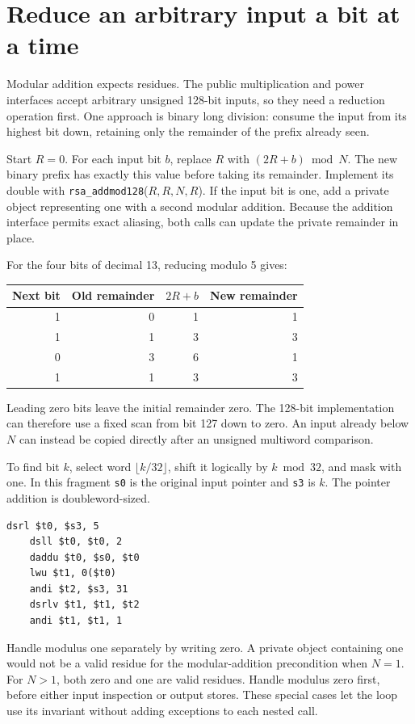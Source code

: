 \section{Reduce an arbitrary input a bit at a time}
Modular addition expects residues. The public multiplication and power interfaces
accept arbitrary unsigned 128-bit inputs, so they need a reduction operation first.
One approach is binary long division: consume the input from its highest bit down,
retaining only the remainder of the prefix already seen.

Start \(R=0\). For each input bit \(b\), replace \(R\) with \((2R+b)\bmod N\).
The new binary prefix has exactly this value before taking its remainder. Implement
its double with \texttt{rsa\_addmod128}(\(R,R,N,R\)). If the input bit is one, add
a private object representing one with a second modular addition. Because the addition
interface permits exact aliasing, both calls can update the private remainder in place.

For the four bits of decimal 13, reducing modulo 5 gives:
\begin{center}
\begin{tabular}{rrrr}
Next bit & Old remainder & \(2R+b\) & New remainder \\
\hline
1 & 0 & 1 & 1 \\
1 & 1 & 3 & 3 \\
0 & 3 & 6 & 1 \\
1 & 1 & 3 & 3 \\
\end{tabular}
\end{center}
Leading zero bits leave the initial remainder zero. The 128-bit implementation can
therefore use a fixed scan from bit 127 down to zero. An input already below \(N\)
can instead be copied directly after an unsigned multiword comparison.

To find bit \(k\), select word \(\lfloor k/32\rfloor\), shift it logically by
\(k\bmod32\), and mask with one. In this fragment \texttt{s0} is the original
input pointer and \texttt{s3} is \(k\). The pointer addition is doubleword-sized.

\begin{verbatim}
dsrl $t0, $s3, 5
    dsll $t0, $t0, 2
    daddu $t0, $s0, $t0
    lwu $t1, 0($t0)
    andi $t2, $s3, 31
    dsrlv $t1, $t1, $t2
    andi $t1, $t1, 1
\end{verbatim}

Handle modulus one separately by writing zero. A private object containing one would
not be a valid residue for the modular-addition precondition when \(N=1\). For \(N>1\),
both zero and one are valid residues. Handle modulus zero first, before either input
inspection or output stores. These special cases let the loop use its invariant
without adding exceptions to each nested call.
